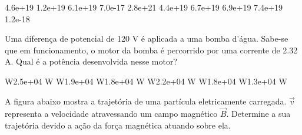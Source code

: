 \documentclass[12pt, addpoints]{exam}
\begin{document}
\begin{questions}
\begin{multicols*}{2}
\begin{oneparchoices}
\choice 4.6e+19 \choice 1.2e+19 \choice 6.1e+19 \choice 7.0e-17 \choice 2.8e+21 \choice 4.4e+19 \choice 6.7e+19 \choice 6.9e+19 \choice 7.4e+19 \choice 1.2e-18 
\end{oneparchoices}\question Uma diferença de potencial de 120 V é aplicada a uma bomba d’água. Sabe-se que em funcionamento, o motor da bomba é percorrido por uma corrente de    2.32 A. Qual é a potência desenvolvida nesse motor?

\begin{oneparchoices}
 W\choice 2.5e+04 W W\choice 1.9e+04 W\choice 1.8e+04 W W\choice 2.2e+04 W W\choice 1.8e+04 W\choice 1.3e+04 W
\end{oneparchoices}\question A ﬁgura abaixo mostra a trajetória de uma partícula eletricamente carregada. $\vec{{v}}$ representa a velocidade atravessando um campo magnético $\vec{{B}}$. Determine a sua trajetória devido a ação da força magnética atuando sobre ela.
        
        \begin{center}
            \begin{minipage}[c]{0.5\linewidth}
            \end{minipage}
        \end{center}

        


\end{multicols*}
\end{questions}
\end{document}
